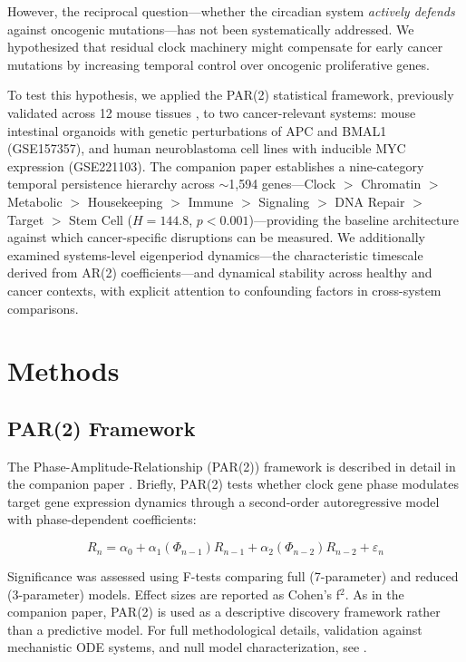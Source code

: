\documentclass[11pt,letterpaper]{article}
\begin{document}
However, the reciprocal question---whether the circadian system \textit{actively defends} against oncogenic mutations---has not been systematically addressed. We hypothesized that residual clock machinery might compensate for early cancer mutations by increasing temporal control over oncogenic proliferative genes.

To test this hypothesis, we applied the PAR(2) statistical framework, previously validated across 12 mouse tissues \citep{whiteside2026paper1}, to two cancer-relevant systems: mouse intestinal organoids with genetic perturbations of APC and BMAL1 (GSE157357), and human neuroblastoma cell lines with inducible MYC expression (GSE221103). The companion paper establishes a nine-category temporal persistence hierarchy across $\sim$1,594 genes---Clock $>$ Chromatin $>$ Metabolic $>$ Housekeeping $>$ Immune $>$ Signaling $>$ DNA Repair $>$ Target $>$ Stem Cell ($H=144.8$, $p<0.001$)---providing the baseline architecture against which cancer-specific disruptions can be measured. We additionally examined systems-level eigenperiod dynamics---the characteristic timescale derived from AR(2) coefficients---and dynamical stability across healthy and cancer contexts, with explicit attention to confounding factors in cross-system comparisons.

\section{Methods}

\subsection{PAR(2) Framework}

The Phase-Amplitude-Relationship (PAR(2)) framework is described in detail in the companion paper \citep{whiteside2026paper1}. Briefly, PAR(2) tests whether clock gene phase modulates target gene expression dynamics through a second-order autoregressive model with phase-dependent coefficients:

\begin{equation}
R_n = \alpha_0 + \alpha_1(\Phi_{n-1})R_{n-1} + \alpha_2(\Phi_{n-2})R_{n-2} + \varepsilon_n
\end{equation}

Significance was assessed using F-tests comparing full (7-parameter) and reduced (3-parameter) models. Effect sizes are reported as Cohen's f$^2$. As in the companion paper, PAR(2) is used as a descriptive discovery framework rather than a predictive model. For full methodological details, validation against mechanistic ODE systems, and null model characterization, see \citet{whiteside2026paper1}.
\end{document}
